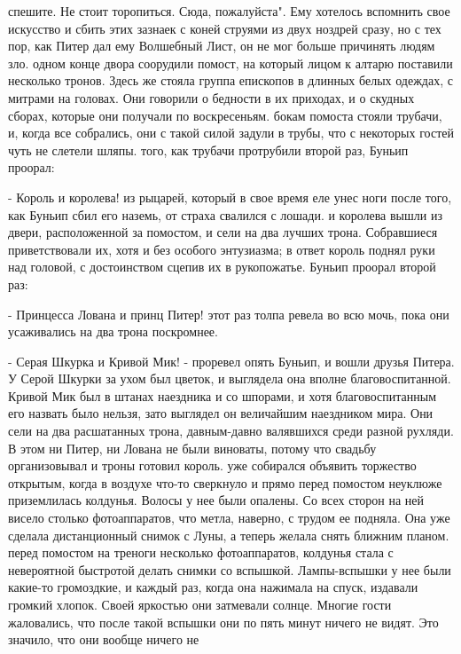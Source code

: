 спешите. Не стоит торопиться. Сюда, пожалуйста". Ему хотелось 
вспомнить свое искусство и сбить этих зазнаек с коней струями из двух 
ноздрей сразу, но с тех пор, как Питер дал ему Волшебный Лист, он не 
мог больше причинять людям зло.
 одном конце двора соорудили помост, на который лицом к алтарю 
поставили несколько тронов. Здесь же стояла группа епископов в длинных 
белых одеждах, с митрами на головах. Они говорили о бедности в их 
приходах, и о скудных сборах, которые они получали по воскресеньям.
 бокам помоста стояли трубачи, и, когда все собрались, они с 
такой силой задули в трубы, что с некоторых гостей чуть не слетели 
шляпы.
 того, как трубачи протрубили второй раз, Буньип проорал:
\par- Король и королева!
 из рыцарей, который в свое время еле унес ноги после того, 
как Буньип сбил его наземь, от страха свалился с лошади.
 и королева вышли из двери, расположенной за помостом, и 
сели на два лучших трона. Собравшиеся приветствовали их, хотя и без 
особого энтузиазма; в ответ король поднял руки над головой, с 
достоинством сцепив их в рукопожатье.
 Буньип проорал второй раз:
\par- Принцесса Лована и принц Питер!
 этот раз толпа ревела во всю мочь, пока они усаживались на два 
трона поскромнее.
\par- Серая Шкурка и Кривой Мик! - проревел опять Буньип, и вошли 
друзья Питера. У Серой Шкурки за ухом был цветок, и выглядела она 
вполне благовоспитанной. Кривой Мик был в штанах наездника и со 
шпорами, и хотя благовоспитанным его назвать было нельзя, зато 
выглядел он величайшим наездником мира. Они сели на два расшатанных 
трона, давным-давно валявшихся среди разной рухляди. В этом ни Питер, 
ни Лована не были виноваты, потому что свадьбу организовывал и троны 
готовил король.
 уже собирался объявить торжество открытым, когда в воздухе 
что-то сверкнуло и прямо перед помостом неуклюже приземлилась 
колдунья. Волосы у нее были опалены. Со всех сторон на ней висело 
столько фотоаппаратов, что метла, наверно, с трудом ее подняла. Она 
уже сделала дистанционный снимок с Луны, а теперь желала снять ближним 
планом.
 перед помостом на треноги несколько фотоаппаратов, 
колдунья стала с невероятной быстротой делать снимки со вспышкой. 
Лампы-вспышки у нее были какие-то громоздкие, и каждый раз, когда она 
нажимала на спуск, издавали громкий хлопок. Своей яркостью они 
затмевали солнце. Многие гости жаловались, что после такой вспышки они 
по пять минут ничего не видят. Это значило, что они вообще ничего не 
